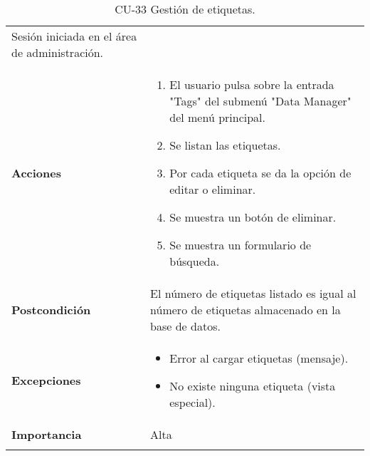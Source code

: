 \begin{longtable}[]{@{}ll@{}}
\begin{minipage}[t]{0.74\columnwidth}
Sesión iniciada en el área de administración.\strut
\end{minipage}\tabularnewline
\begin{minipage}[t]{0.20\columnwidth}\raggedright
\textbf{Acciones}\strut
\end{minipage} & \begin{minipage}[t]{0.74\columnwidth}\raggedright
\begin{enumerate}
\def\labelenumi{\arabic{enumi}.}
\tightlist
\item
  El usuario pulsa sobre la entrada "Tags" del submenú "Data Manager"
  del menú principal.
\item
  Se listan las etiquetas.
\item
  Por cada etiqueta se da la opción de editar o eliminar.
\item
  Se muestra un botón de eliminar.
\item
  Se muestra un formulario de búsqueda.
\end{enumerate}\strut
\end{minipage}\tabularnewline
\begin{minipage}[t]{0.20\columnwidth}\raggedright
\textbf{Postcondición}\strut
\end{minipage} & \begin{minipage}[t]{0.74\columnwidth}\raggedright
El número de etiquetas listado es igual al número de etiquetas
almacenado en la base de datos.\strut
\end{minipage}\tabularnewline
\begin{minipage}[t]{0.20\columnwidth}\raggedright
\textbf{Excepciones}\strut
\end{minipage} & \begin{minipage}[t]{0.74\columnwidth}\raggedright
\begin{itemize}
\tightlist
\item
  Error al cargar etiquetas (mensaje).
\item
  No existe ninguna etiqueta (vista especial).
\end{itemize}\strut
\end{minipage}\tabularnewline
\begin{minipage}[t]{0.20\columnwidth}\raggedright
\textbf{Importancia}\strut
\end{minipage} & \begin{minipage}[t]{0.74\columnwidth}\raggedright
Alta\strut
\end{minipage}\tabularnewline
\bottomrule
\caption{CU-33 Gestión de etiquetas.}
\end{longtable}

